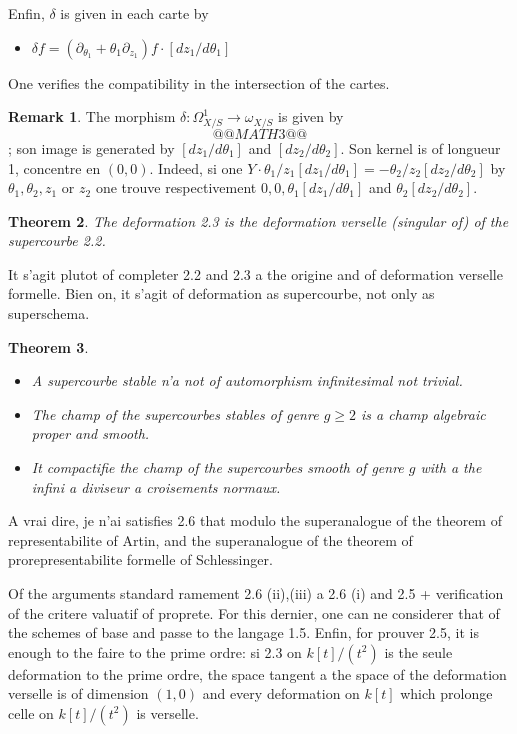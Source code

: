 \documentclass[11pt,a4paper]{article}
\theoremstyle{plain}
\newtheorem{theorem}{Theorem}
\theoremstyle{definition}
\newtheorem{remark}[theorem]{Remark}
\begin{document}
Enfin, $\delta$ is given in each carte by
\begin{itemize}
\item[(1)] $\delta f = (\partial_{\theta_1} + \theta_1\partial_{z_1})f \cdot [dz_1/d\theta_1]$
\end{itemize}
One verifies the compatibility in the intersection of the cartes.

\newpage

\begin{remark}\label{rem2.4}
The morphism $\delta : \Omega^1_{X/S} \to \omega_{X/S}$ is given by
\[
@@MATH3@@
\]; son image is generated by $[dz_1/d\theta_1]$ and $[dz_2/d\theta_2]$. Son kernel is of longueur 1, concentre en $(0,0)$. Indeed, si one $Y \cdot \theta_1/z_1 [dz_1/d\theta_1] = -\theta_2/z_2 [dz_2/d\theta_2]$ by $\theta_1, \theta_2, z_1$ or $z_2$ one trouve respectivement $0, 0, \theta_1[dz_1/d\theta_1]$ and $\theta_2[dz_2/d\theta_2]$.
\end{remark}

\begin{theorem}\label{thm2.5}
The deformation 2.3 is the deformation verselle (singular of) of the supercourbe 2.2.
\end{theorem}

It s'agit plutot of completer 2.2 and 2.3 a the origine and of deformation verselle formelle. Bien on, it s'agit of deformation as supercourbe, not only as superschema.

\begin{theorem}\label{thm2.6}
\begin{itemize}
\item[(i)] A supercourbe stable n'a not of automorphism infinitesimal not trivial.
\item[(ii)] The champ of the supercourbes stables of genre $g \geq 2$ is a champ algebraic proper and smooth.
\item[(iii)] It compactifie the champ of the supercourbes smooth of genre $g$ with a the infini a diviseur a croisements normaux.
\end{itemize}
\end{theorem}

A vrai dire, je n'ai satisfies 2.6 that modulo the superanalogue of the theorem of representabilite of Artin, and the superanalogue of the theorem of prorepresentabilite formelle of Schlessinger.

\newpage

Of the arguments standard ramement 2.6 (ii),(iii) a 2.6 (i) and 2.5 + verification of the critere valuatif of proprete. For this dernier, one can ne considerer that of the schemes of base and passe to the langage 1.5. Enfin, for prouver 2.5, it is enough to the faire to the prime ordre: si 2.3 on $k[t]/(t^2)$ is the seule deformation to the prime ordre, the space tangent a the space of the deformation verselle is of dimension $(1,0)$ and every deformation on $k[t]$ which prolonge celle on $k[t]/(t^2)$ is verselle.
\end{document}
